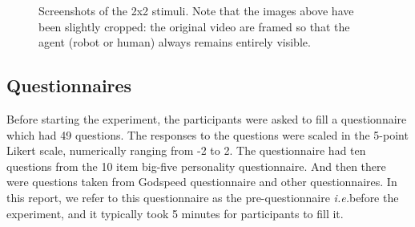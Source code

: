 \documentclass[a4,twocolumn,10pt]{article}
\newcommand{\ie}{{\textit{i.e.\xspace}}}
\begin{document}
\begin{figure}
    \centering



    \caption{\small Screenshots of the 2x2 stimuli. Note that the images above have been
    slightly cropped: the original video are framed so that the agent (robot or
    human) always remains entirely visible.}
    \label{fig:stimuli}
\end{figure}

\subsection{Questionnaires}

Before starting the experiment, the participants were asked to fill a
questionnaire which had 49 questions. The responses to the questions were scaled
in the 5-point Likert scale, numerically ranging from -2 to 2. The questionnaire
had ten questions from the 10 item big-five personality questionnaire. And then
there were questions taken from Godspeed questionnaire and other
questionnaires. In this report, we refer to this questionnaire as the
pre-questionnaire \ie before the experiment, and it typically took 5 minutes for
participants to fill it. 
\end{document}
